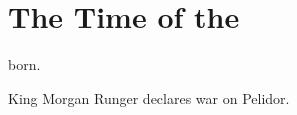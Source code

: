 \section{The Time of the \Thirdbanewar}
\begin{timeline}
  
   born. 
  
  King Morgan Runger declares war on Pelidor. 
\end{timeline}









































